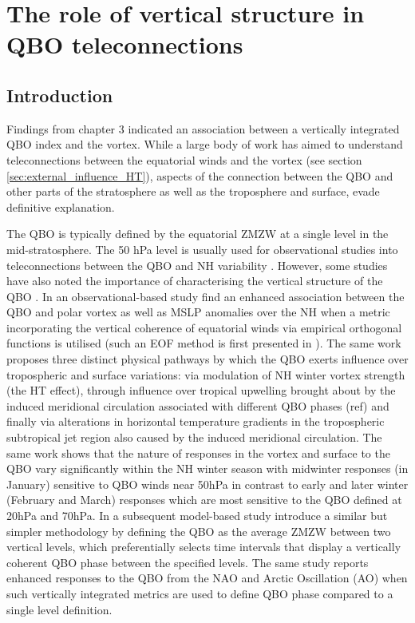 \chapter{The role of vertical structure in QBO teleconnections}
\label{cha:deepQBO}

\section{Introduction}
\label{sec:deepQBO-introduction}

Findings from chapter 3 indicated an association between a vertically integrated QBO index and the vortex. While a large body of work has aimed to understand teleconnections between the equatorial winds and the vortex (see section \ref{sec:external_influence_HT}), aspects of the connection between the QBO and other parts of the stratosphere as well as the troposphere and surface, evade definitive explanation.

The QBO is typically defined by the equatorial ZMZW at a single level in the mid-stratosphere. The 50 hPa level is usually used for observational studies into teleconnections between the QBO and NH variability \citep{Baldwin2001, Baldwin98}. However, some studies have also noted the importance of characterising the vertical structure of the QBO \citep{Fraedrih1993, Wallace1993,  Baldwin98,  Dunkerton2017, graySurface2018, andrewsObserved2019}. In an observational-based study \cite{graySurface2018} find an enhanced association between the QBO and polar vortex as well as MSLP anomalies over the NH when a metric incorporating the vertical coherence of equatorial winds via empirical orthogonal functions is utilised (such an EOF method is first presented in \citep{verena2016a}). The same work proposes three distinct physical pathways by which the QBO exerts influence over tropospheric and surface variations: via modulation of NH winter vortex strength (the HT effect), through influence over tropical upwelling brought about by the induced meridional circulation associated with different QBO phases (ref) and finally via alterations in horizontal temperature gradients in the tropospheric subtropical jet region also caused by the induced meridional circulation. The same work shows that the nature of responses in the vortex and surface to the QBO vary significantly within the NH winter season with midwinter responses (in January) sensitive to QBO winds near 50hPa in contrast to early and later winter (February and March) responses which are most sensitive to the QBO defined at 20hPa and 70hPa. In a subsequent model-based study \cite{andrewsObserved2019} introduce a similar but simpler methodology by defining the QBO as the average ZMZW between two vertical levels, which preferentially selects time intervals that display a vertically coherent QBO phase between the specified levels. The same study reports enhanced responses to the QBO from the NAO and Arctic Oscillation (AO) when such vertically integrated metrics are used to define QBO phase compared to a single level definition. 

